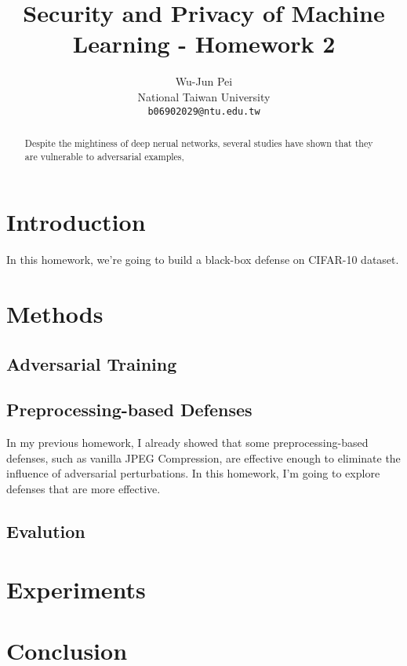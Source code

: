 \documentclass{article}
\title{Security and Privacy of Machine Learning - Homework 2}
\author{
  Wu-Jun Pei\\
  National Taiwan University\\
  \texttt{b06902029@ntu.edu.tw} \\
}
\begin{document}
\maketitle

\begin{abstract}
  Despite the mightiness of deep nerual networks, several studies have shown that they are
  vulnerable to adversarial examples,
\end{abstract}

\section{Introduction}
  In this homework, we're going to build a black-box defense on CIFAR-10 dataset.



\section{Methods}
\subsection{Adversarial Training}

\subsection{Preprocessing-based Defenses}
  In my previous homework, I already showed that some preprocessing-based defenses, such as vanilla
  JPEG Compression, are effective enough to eliminate the influence of adversarial perturbations. In
  this homework, I'm going to explore defenses that are more effective.

\subsection{Evalution}

\section{Experiments}

\section{Conclusion}



\end{document}
